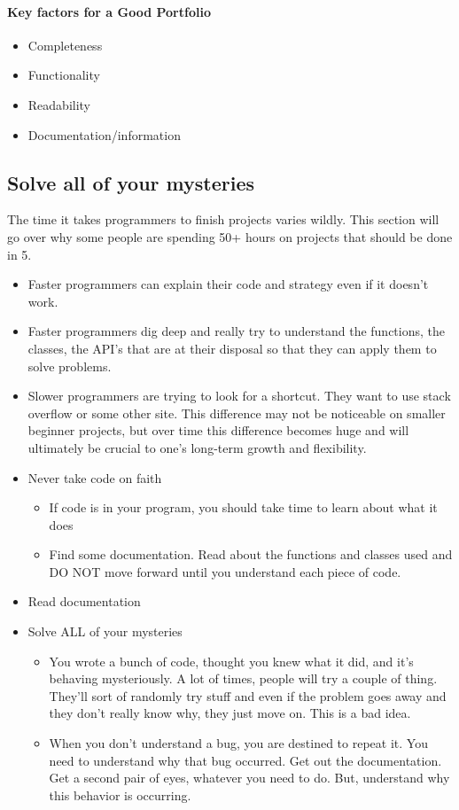 \paragraph*{Key factors for a Good Portfolio}
\begin{itemize}
	\item Completeness
	\item Functionality
	\item Readability
	\item Documentation/information
\end{itemize}

\subsection{Solve all of your mysteries}

The time it takes programmers to finish projects varies wildly. This section will go over why some people are spending 50+ hours on projects that should be done in 5.

\begin{itemize}
	\item
	Faster programmers can explain their code and strategy even if it  doesn't work.
	\item
	Faster programmers dig deep and really try to understand the functions, the classes, the API's that are at their disposal so that they can apply them to solve problems.
	\item
	Slower programmers are trying to look for a shortcut. They want to use stack overflow or some other site. This difference may not be noticeable on smaller beginner projects, but over time this difference becomes huge and will ultimately be crucial to one's long-term growth and flexibility.
	\item
	Never take code on faith

	\begin{itemize}
		\item
		If code is in your program, you should take time to learn about what it does
		\item
		Find some documentation. Read about the functions and classes used and DO NOT move forward until you understand each piece of code.
	\end{itemize}
	\item
	Read documentation
	\item
	Solve ALL of your mysteries
	\begin{itemize}
		\item
		You wrote a bunch of code, thought you knew what it did, and it's behaving mysteriously. A lot of times, people will try a couple of thing. They'll sort of randomly try stuff and even if the problem goes away and they don't really know why, they just move on. This is a bad idea.
		\item
		When you don't understand a bug, you are destined to repeat it. You need to understand why that bug occurred. Get out the documentation. Get a second pair of eyes, whatever you need to do. But, understand why this behavior is occurring.
	\end{itemize}
\end{itemize}

